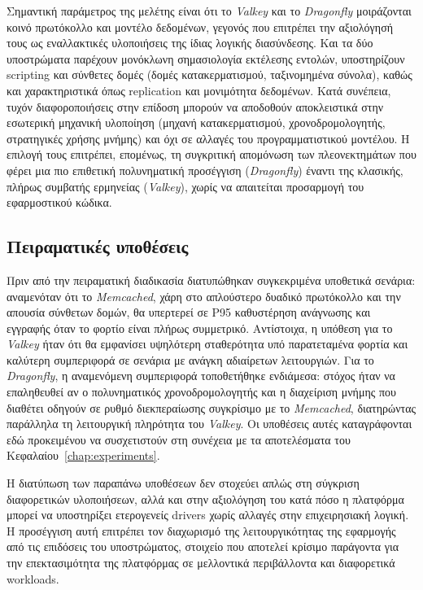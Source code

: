 Σημαντική παράμετρος της μελέτης είναι ότι το \textit{Valkey} και το
\textit{Dragonfly} μοιράζονται κοινό πρωτόκολλο και μοντέλο δεδομένων, γεγονός
που επιτρέπει την αξιολόγησή τους ως εναλλακτικές υλοποιήσεις της ίδιας λογικής
διασύνδεσης. Και τα δύο υποστρώματα παρέχουν μονόκλωνη σημασιολογία εκτέλεσης
εντολών, υποστηρίζουν scripting και σύνθετες δομές (δομές κατακερματισμού,
ταξινομημένα σύνολα), καθώς και χαρακτηριστικά όπως replication και μονιμότητα
δεδομένων. Κατά συνέπεια, τυχόν διαφοροποιήσεις στην επίδοση μπορούν να
αποδοθούν αποκλειστικά στην εσωτερική μηχανική υλοποίηση (μηχανή
κατακερματισμού, χρονοδρομολογητής, στρατηγικές χρήσης μνήμης) και όχι σε
αλλαγές του προγραμματιστικού μοντέλου. Η επιλογή τους επιτρέπει, επομένως, τη
συγκριτική απομόνωση των πλεονεκτημάτων που φέρει μια πιο επιθετική
πολυνηματική προσέγγιση (\textit{Dragonfly}) έναντι της κλασικής, πλήρως
συμβατής ερμηνείας (\textit{Valkey}), χωρίς να απαιτείται προσαρμογή του
εφαρμοστικού κώδικα.

\subsection{Πειραματικές υποθέσεις}

Πριν από την πειραματική διαδικασία διατυπώθηκαν συγκεκριμένα υποθετικά
σενάρια: αναμενόταν ότι το \textit{Memcached}, χάρη στο απλούστερο δυαδικό
πρωτόκολλο και την απουσία σύνθετων δομών, θα υπερτερεί σε P95 καθυστέρηση
ανάγνωσης και εγγραφής όταν το φορτίο είναι πλήρως συμμετρικό. Αντίστοιχα, η
υπόθεση για το \textit{Valkey} ήταν ότι θα εμφανίσει υψηλότερη σταθερότητα υπό
παρατεταμένα φορτία και καλύτερη συμπεριφορά σε σενάρια με ανάγκη αδιαίρετων
λειτουργιών. Για το \textit{Dragonfly}, η αναμενόμενη συμπεριφορά τοποθετήθηκε
ενδιάμεσα: στόχος ήταν να επαληθευθεί αν ο πολυνηματικός χρονοδρομολογητής και
η διαχείριση μνήμης που διαθέτει οδηγούν σε ρυθμό διεκπεραίωσης συγκρίσιμο με
το \textit{Memcached}, διατηρώντας παράλληλα τη λειτουργική πληρότητα του
\textit{Valkey}. Οι υποθέσεις αυτές καταγράφονται εδώ προκειμένου να
συσχετιστούν στη συνέχεια με τα αποτελέσματα του
Κεφαλαίου~\ref{chap:experiments}.

Η διατύπωση των παραπάνω υποθέσεων δεν στοχεύει απλώς στη σύγκριση διαφορετικών
υλοποιήσεων, αλλά και στην αξιολόγηση του κατά πόσο η πλατφόρμα μπορεί να
υποστηρίξει ετερογενείς drivers χωρίς αλλαγές στην επιχειρησιακή λογική. Η
προσέγγιση αυτή επιτρέπει τον διαχωρισμό της λειτουργικότητας της εφαρμογής από
τις επιδόσεις του υποστρώματος, στοιχείο που αποτελεί κρίσιμο παράγοντα για την
επεκτασιμότητα της πλατφόρμας σε μελλοντικά περιβάλλοντα και διαφορετικά
workloads.

